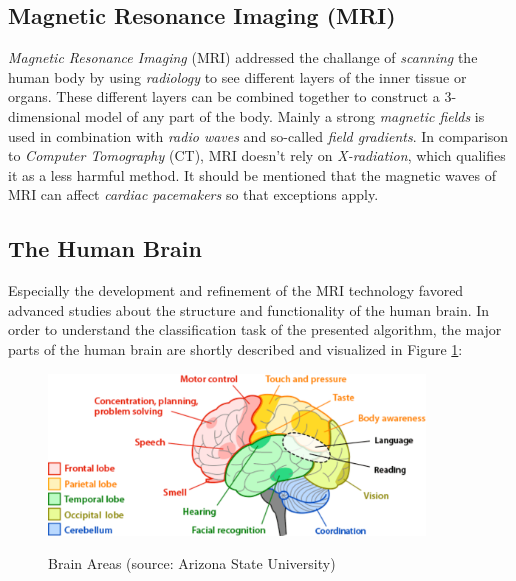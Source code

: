 \documentclass[twoside,11pt]{article}
\begin{document}
\subsection{Magnetic Resonance Imaging (MRI)}
\textit{Magnetic Resonance Imaging} (MRI) addressed the challange of 
\textit{scanning} the human body by using \textit{radiology}  to see different layers of the inner tissue or organs. These different layers can be combined together to construct a 3-dimensional model of any part of the body. Mainly a strong  \textit{magnetic fields} is used in combination with \textit{radio waves}  and so-called \textit{field gradients}.
In comparison to \textit{Computer Tomography} (CT), MRI doesn't rely on \textit{X-radiation}, which qualifies it as a less harmful method. It should be mentioned that the magnetic waves of MRI can affect \textit{cardiac pacemakers} so that exceptions apply. \citep{edelman1993magnetic}

\subsection{The Human Brain}
\label{brain}
Especially the development and refinement of the MRI technology favored advanced studies about the structure and functionality of the human brain. In order to understand the classification task of the presented algorithm, the major parts of the human brain are shortly described and visualized in Figure \ref{fig:brain}:
\begin{figure}
	\centering
	\includegraphics[width=10cm]{brain-areas}
	\label{fig:brain}
	\caption{Brain Areas (source: Arizona State University)}
\end{figure}%
\end{document}
